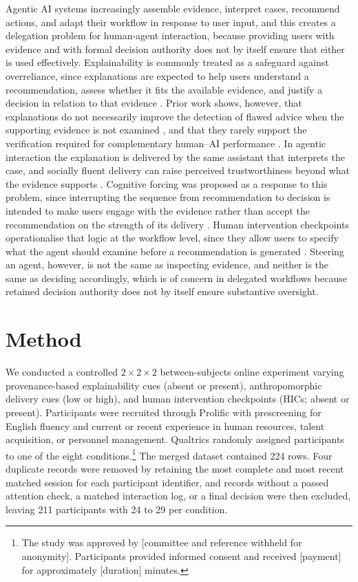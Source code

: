 Agentic AI systems increasingly assemble evidence, interpret cases,
recommend actions, and adapt their workflow in response to user input, and
this creates a delegation problem for human-agent interaction, because
providing users with evidence and with formal decision authority does not
by itself ensure that either is used effectively. Explainability is
commonly treated as a safeguard against overreliance, since explanations
are expected to help users understand a recommendation, assess whether it
fits the available evidence, and justify a decision in relation to that
evidence \cite{lee_trust_2004, schemmer_appropriate_2023}. Prior work
shows, however, that explanations do not necessarily improve the detection
of flawed advice when the supporting evidence is not examined
\cite{bucinca_trust_2021, vasconcelos_explanations_2023,
poursabzi-sangdeh_manipulating_2021}, and that they rarely support the
verification required for complementary human--AI performance
\cite{fok_search_2024}. In agentic interaction the explanation is delivered
by the same assistant that interprets the case, and socially fluent
delivery can raise perceived trustworthiness beyond what the evidence
supports \cite{araujo_living_2018, kramer_tricking_2025,
stinkeste_linguistic_2025}. Cognitive forcing was proposed as a response to
this problem, since interrupting the sequence from recommendation to
decision is intended to make users engage with the evidence rather than
accept the recommendation on the strength of its delivery
\cite{bucinca_trust_2021}. Human intervention checkpoints operationalise
that logic at the workflow level, since they allow users to specify what
the agent should examine before a recommendation is generated
\cite{horvitz_principles_1999}. Steering an agent, however, is not the same
as inspecting evidence, and neither is the same as deciding accordingly,
which is of concern in delegated workflows because retained decision
authority does not by itself ensure substantive oversight.

\section{Method}

We conducted a controlled $2 \times 2 \times 2$ between-subjects online
experiment varying provenance-based explainability cues (absent or
present), anthropomorphic delivery cues (low or high), and human
intervention checkpoints (HICs; absent or present). Participants were
recruited through Prolific with prescreening for English fluency and
current or recent experience in human resources, talent acquisition, or
personnel management. Qualtrics randomly assigned participants to one of the
eight conditions.\footnote{The study was approved by [committee and reference
withheld for anonymity]. Participants provided informed consent and
received [payment] for approximately [duration] minutes.} The merged
dataset contained 224 rows. Four duplicate records were removed by
retaining the most complete and most recent matched session for each
participant identifier, and records without a passed attention check, a
matched interaction log, or a final decision were then excluded, leaving
211 participants with 24 to 29 per condition.

